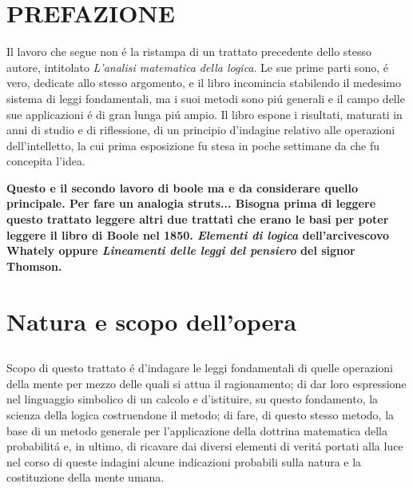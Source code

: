 \documentclass[a4paper,10pt]{book}
\begin{document}
\chapter*{PREFAZIONE}
Il lavoro che segue non \'{e} la ristampa di un trattato precedente dello stesso autore, intitolato \textit{L'analisi matematica della logica}. Le sue prime parti sono, \'{e} vero,
dedicate allo stesso argomento, e il libro incomincia stabilendo il medesimo sistema di leggi fondamentali, ma i suoi metodi sono pi\'{u} generali e il campo delle sue applicazioni
\'{e} di gran lunga pi\'{u} ampio. Il libro espone i risultati, maturati in anni di studio e di riflessione, di un principio d'indagine relativo alle operazioni dell'intelletto, la cui
prima esposizione fu stesa in poche settimane da che fu concepita l'idea.

\textbf{Questo e il secondo lavoro di boole ma e da considerare quello principale. Per fare un analogia struts... Bisogna prima di leggere questo trattato
  leggere altri due trattati che erano le basi per poter leggere il libro di Boole nel 1850.  
  \textit{Elementi di logica} dell'arcivescovo Whately oppure \textit{Lineamenti delle leggi del pensiero} del signor Thomson.
}

\chapter{Natura e scopo dell'opera}
\section{}
Scopo di questo trattato \'{e} d'indagare le leggi fondamentali di quelle operazioni della mente per mezzo delle quali si attua il ragionamento; di dar loro espressione nel linguaggio
simbolico di un calcolo e d'istituire, su questo fondamento, la scienza della logica costruendone il metodo; di fare, di questo stesso metodo, la base di un metodo generale per
l'applicazione della dottrina matematica della probabilit\'{a} e, in ultimo, di ricavare dai diversi elementi di verit\'{a} portati alla luce nel corso di queste indagini alcune
indicazioni probabili sulla natura e la costituzione della mente umana.
\end{document}
